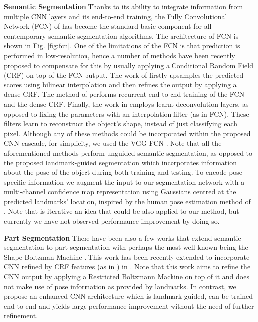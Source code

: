 \textbf{Semantic Segmentation} Thanks to its ability to integrate
information from multiple CNN layers and its end-to-end training, the
Fully Convolutional Network (FCN) of \cite{long2015fully} has become
the standard basic component for all contemporary semantic
segmentation algorithms. The architecture of FCN is shown in
Fig. \ref{fig:fcn}. One of the limitations of the FCN is that
prediction is performed in low-resolution, hence a number of methods
have been recently proposed to compensate for this by usually applying
a Conditional Random Field (CRF) on top of the FCN output. The work of
\cite{chen2015semantic} firstly upsamples the predicted scores using
bilinear interpolation and then refines the output by applying a dense
CRF. The method of \cite{zheng2015conditional} performs recurrent
end-to-end training of the FCN and the dense CRF. Finally, the work in
\cite{noh2015learning} employs learnt deconvolution layers, as opposed
to fixing the parameters with an interpolation filter (as in
FCN). These filters learn to reconstruct the object's shape, instead
of just classifying each pixel. Although any of these methods could be
incorporated within the proposed CNN cascade, for simplicity, we used
the VGG-FCN \cite{simonyan2014very}. Note that all the aforementioned
methods perform unguided semantic segmentation, as opposed to the
proposed landmark-guided segmentation which incorporates information
about the pose of the object during both training and testing. To
encode pose specific information we augment the input to our
segmentation network with a multi-channel confidence map
representation using Gaussians centred at the predicted landmarks'
location, inspired by the human pose estimation method of
\cite{carreira2016human}. Note that \cite{carreira2016human} is
iterative an idea that could be also applied to our method, but
currently we have not observed performance improvement by doing so.

\textbf{Part Segmentation} There have been also a few works that
extend semantic segmentation to part segmentation with perhaps the
most well-known being the Shape Boltzman Machine
\cite{eslami2012generative,eslami2014shape}. This work has been
recently extended to incorporate CNN refined by CRF features (as in
\cite{chen2015semantic}) in \cite{tsogkas2015deep}. Note that this
work aims to refine the CNN output by applying a Restricted Boltzmann
Machine on top of it and does not make use of pose information as
provided by landmarks. In contrast, we propose an enhanced CNN
architecture which is landmark-guided, can be trained end-to-end and
yields large performance improvement without the need of further
refinement.

